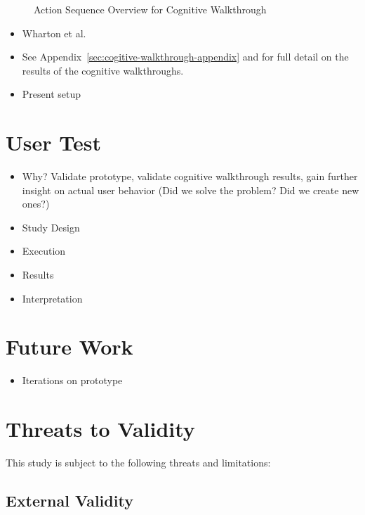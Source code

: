 \documentclass[sigplan,screen,nonacm,review]{acmart}
\begin{document}
\begin{figure}
	\centering
	\Description{}
	\caption{Action Sequence Overview for Cognitive Walkthrough}
	\label{fig:steps-prototype}
\end{figure}

\begin{itemize}
	\item Wharton et al. \cite{Wharton_Rieman_Clayton_Polson_1994}
	\item See Appendix~\ref{sec:cogitive-walkthrough-appendix} and for full detail on the results of the cognitive walkthroughs.
	\item Present setup
\end{itemize}


\section{User Test}

\begin{itemize}
	\item Why? Validate prototype, validate cognitive walkthrough results, gain further insight on actual user behavior (Did we solve the problem? Did we create new ones?)
	\item Study Design
	\item Execution
	\item Results
	\item Interpretation
\end{itemize}

\section{Future Work}
\label{sec:future}

\begin{itemize}
	\item Iterations on prototype
\end{itemize}

\section{Threats to Validity}
\label{sec:threats}

This study is subject to the following threats and limitations:

\subsection{External Validity}
\end{document}
